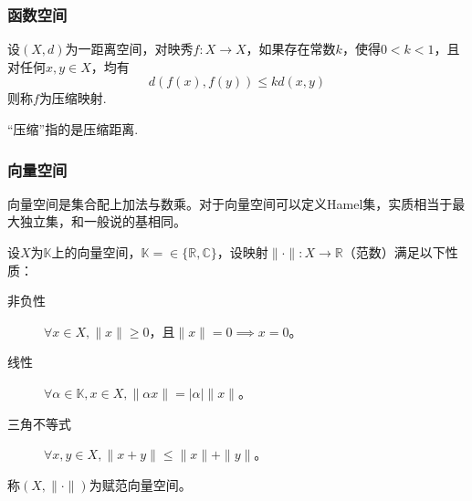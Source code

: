 \subsubsection{函数空间}
\begin{definition}[压缩映射]\label{concen-map}
设$(X,d)$为一距离空间，对映秀$f:X\rightarrow X$，如果存在常数$k$，使得$0<k<1$，且对任何$x,y\in X$，均有
$$d(f(x),f(y))\leq k d(x,y)$$
则称$f$为压缩映射.
\end{definition}

“压缩”指的是压缩距离.

\subsubsection{向量空间}
向量空间是集合配上加法与数乘。对于向量空间可以定义Hamel集，实质相当于最大独立集，和一般说的基相同。

\begin{definition}[赋范向量空间]\label{def::norm-vec-space}
设$X$为$\mathbb{K}$上的向量空间，$\mathbb{K}=\in\{\mathbb{R,C}\}$，设映射$\|\cdot\|:X\rightarrow\mathbb{R}$（范数）满足以下性质：
\begin{description}
\item[非负性] $\forall x\in X,\|x\|\geq 0$，且$\|x\|=0\implies x=0$。
\item[线性] $\forall \alpha \in \mathbb{K},x\in X, \|\alpha x\|=|\alpha|\|x\|$。
\item[三角不等式] $\forall x,y\in X,\|x+y\|\leq \|x\|+\|y\|$。
\end{description}
称$(X,\|\cdot\|)$为赋范向量空间。
\end{definition}
